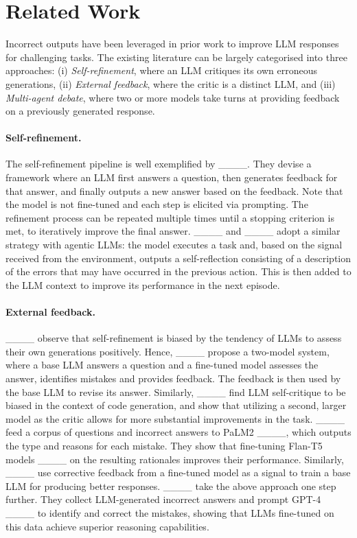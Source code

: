 \section{Related Work}
Incorrect outputs have been leveraged in prior work to improve LLM responses for challenging tasks. The existing literature can be largely categorised into three approaches: (i) \textit{Self-refinement}, where an LLM critiques its own erroneous generations, (ii) \textit{External feedback}, where the critic is a distinct LLM, and (iii) \textit{Multi-agent debate}, where two or more models take turns at providing feedback on a previously generated response.

\paragraph{Self-refinement.} The self-refinement pipeline is well exemplified by ____. They devise a framework where an LLM first answers a question, then generates feedback for that answer, and finally outputs a new answer based on the feedback. Note that the model is not fine-tuned and each step is elicited via prompting. The refinement process can be repeated multiple times until a stopping criterion is met, to iteratively improve the final answer. ____ and ____ adopt a similar strategy with agentic LLMs: the model executes a task and, based on the signal received from the environment, outputs a self-reflection consisting of a description of the errors that may have occurred in the previous action. This is then added to the LLM context to improve its performance in the next episode.

\paragraph{External feedback.} ____ observe that self-refinement is biased by the tendency of LLMs to assess their own generations positively.  Hence, ____ propose a two-model system, where a base LLM answers a question and a fine-tuned model assesses the answer, identifies mistakes and provides feedback. The feedback is then used by the base LLM to revise its answer. Similarly, ____ find LLM self-critique to be biased in the context of code generation, and show that utilizing a second, larger model as the critic allows for more substantial improvements in the task. ____ feed a corpus of questions and incorrect answers to PaLM2 ____, which outputs the type and reasons for each mistake. They show that fine-tuning Flan-T5 models ____ on the resulting rationales improves their performance. Similarly, ____ use corrective feedback from a fine-tuned model as a signal to train a base LLM for producing better responses. ____ take the above approach one step further. They collect LLM-generated incorrect answers and prompt GPT-4 ____ to identify and correct the mistakes, showing that LLMs fine-tuned on this data achieve superior reasoning capabilities.

